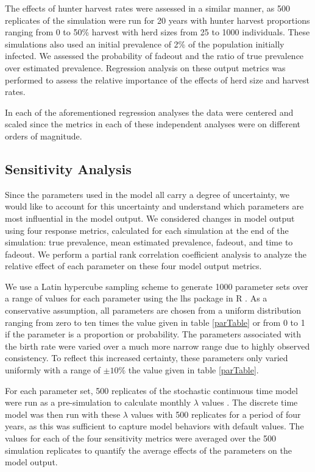 \documentclass[number,preprint,review,12pt]{elsarticle}
\begin{document}
The effects of hunter harvest rates were assessed in a similar manner, as 500 replicates of the simulation were run for 20 years with hunter harvest proportions ranging from 0 to 50\% harvest with herd sizes from 25 to 1000 individuals. These simulations also used an initial prevalence of 2\% of the population initially infected. We assessed the probability of fadeout and the ratio of true prevalence over estimated prevalence. Regression analysis on these output metrics was performed to assess the relative importance of the effects of herd size and harvest rates. 

In each of the aforementioned regression analyses the data were centered and scaled since the metrics in each of these independent analyses were on different orders of magnitude. 

\subsection{Sensitivity Analysis} 
Since the parameters used in the model all carry a degree of uncertainty, we would like to account for this uncertainty and understand which parameters are most influential in the model output. We considered changes in model output using four response metrics, calculated for each simulation at the end of the simulation: true prevalence, mean estimated prevalence, fadeout, and time to fadeout. We perform a partial rank correlation coefficient analysis to analyze the relative effect of each parameter on these four model output metrics. 

We use a Latin hypercube sampling scheme to generate 1000 parameter sets over a range of values for each parameter using the lhs package in R \citep{lhs}. As a conservative assumption, all parameters are chosen from a uniform distribution ranging from zero to ten times the value given in table \ref{parTable} or from 0 to 1 if the parameter is a proportion or probability. The parameters associated with the birth rate were varied over a much more narrow range due to highly observed consistency. To reflect this increased certainty, these parameters only varied uniformly with a range of $\pm10\%$ the value given in table \ref{parTable}. 

For each parameter set, 500 replicates of the stochastic continuous time model were run as a pre-simulation to calculate monthly $\lambda$ values \citep{SANDMANN}. The discrete time model was then run with these $\lambda$ values with 500 replicates for a period of four years, as this was sufficient to capture model behaviors with default values. The values for each of the four sensitivity metrics were averaged over the 500 simulation replicates to quantify the average effects of the parameters on the model output.
\end{document}
